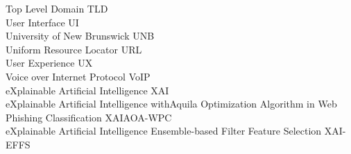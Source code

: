Top Level Domain \hfill TLD\\
User Interface \hfill UI\\
University of New Brunswick \hfill UNB\\
Uniform Resource Locator \hfill URL\\
User Experience \hfill UX\\
Voice over Internet Protocol \hfill VoIP\\
eXplainable Artificial Intelligence \hfill XAI\\
eXplainable Artificial Intelligence with\newline Aquila Optimization Algorithm in Web Phishing Classification \hfill XAIAOA-WPC\\
eXplainable Artificial Intelligence Ensemble-based Filter Feature Selection \hfill XAI-EFFS\\

